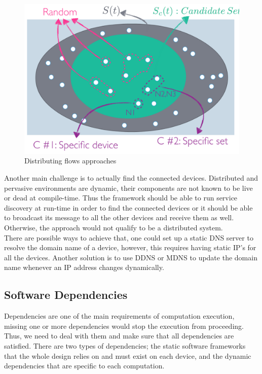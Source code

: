  \begin{figure}[H]
 	\centering
 	\includegraphics[scale=0.45]{images/set.png} 
 	\caption{Distributing flows approaches}
 	\label{fig:distributing-flows}
 \end{figure}

\noindent Another main challenge is to actually find the connected devices. Distributed and pervasive environments are dynamic, their components are not known to be live or dead at compile-time. Thus the framework should be able to run service discovery at run-time in order to find the connected devices or it should be able to broadcast its message to all the other devices and receive them as well. Otherwise, the approach would not qualify to be a distributed system. \\

\noindent There are possible ways to achieve that, one could set up a static DNS server to resolve the domain name of a device, however, this requires having static IP's for all the devices. Another solution is to use DDNS or MDNS to update the domain name whenever an IP address changes dynamically.









\subsection{Software Dependencies}

Dependencies are one of the main requirements of computation execution, missing one or more dependencies would stop the execution from proceeding. Thus, we need to deal with them and make sure that all dependencies are satisfied.  There are two types of dependencies; the static software frameworks that the whole design relies on and must exist on each device, and the dynamic dependencies that are specific to each computation. \\

